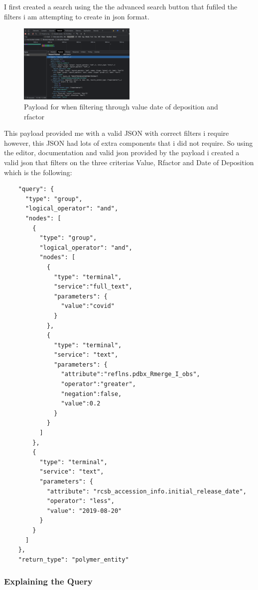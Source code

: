 \documentclass[]{final_report}
\begin{document}
I first created a search using the the advanced search button that fufiled the filters i am attempting to create in json format.

\begin{figure}[ht]
    \centering
    \includegraphics[width=0.5\textwidth]{payload.png}
    \caption{\label{fig:payload}Payload for when filtering through value date of deposition and rfactor}
\end{figure}

This payload provided me with a valid JSON with correct filters i require however, this JSON had lots of extra components that i did not require. So using the editor, documentation and valid json provided by the payload i created a valid json that filters on the three criterias Value, Rfactor and Date of Deposition which is the following:

\begin{lstlisting}
    "query": {
      "type": "group",
      "logical_operator": "and",
      "nodes": [
        {
          "type": "group",
          "logical_operator": "and",
          "nodes": [
            {
              "type": "terminal",
              "service":"full_text",
              "parameters": {
                "value":"covid"
              }
            },
            {
              "type": "terminal",
              "service": "text",
              "parameters": {
                "attribute":"reflns.pdbx_Rmerge_I_obs",
                "operator":"greater",
                "negation":false,
                "value":0.2
              }
            }
          ]
        },
        {
          "type": "terminal",
          "service": "text",
          "parameters": {
            "attribute": "rcsb_accession_info.initial_release_date",
            "operator": "less",
            "value": "2019-08-20"
          }
        }
      ]
    },
    "return_type": "polymer_entity"
\end{lstlisting}

\subsubsection{Explaining the Query}
\end{document}
